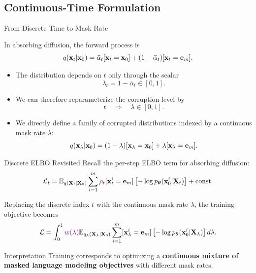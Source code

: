 \documentclass{beamer}
\renewcommand{\eqpause}{}
\begin{document}
\subsection{Continuous-Time Formulation}
\begin{frame}{From Discrete Time to Mask Rate}

    In absorbing diffusion, the forward process is
    \[
        q(\mathbf{x}_t | \mathbf{x}_0) =
        \bar\alpha_t[\mathbf{x}_t=\mathbf{x}_0]
        +
        (1-\bar\alpha_t)[\mathbf{x}_t=\mathbf{e}_m].
    \]
	\vspace{-0.5cm}
    \eqpause
	\begin{itemize}
		\item The distribution depends on $t$ only through the scalar
		\[
			\lambda_t = 1-\bar\alpha_t \in [0,1].
		\]
		\vspace{-0.5cm}
    	\eqpause
		\item We can therefore reparameterize the corruption level by
		\[
			t \quad \Rightarrow \quad \lambda \in [0,1].
		\]
		\vspace{-0.5cm}
		\eqpause
		\item We directly define a family of corrupted distributions indexed by
		a continuous mask rate $\lambda$:
		\[
			q(\mathbf{x}_\lambda | \mathbf{x}_0) =
			(1-\lambda)[\mathbf{x}_{\lambda}=\mathbf{x}_0]
			+ \lambda[\mathbf{x}_{\lambda}=\mathbf{e}_m].
		\]
	\end{itemize}
\end{frame}
\begin{frame}{Discrete ELBO Revisited}
    Recall the per-step ELBO term for absorbing diffusion:
    \[
        \mathcal{L}_t
        =
        \mathbb{E}_{q(\mathbf{X}_t | \mathbf{X}_0)}
        \sum_{i=1}^m
        {\color{violet}\rho_t}[\mathbf{x}_t^i=\mathbf e_m]
        \left[-\log p_{\boldsymbol{\theta}}(\mathbf{x}_0^i | \mathbf{X}_t)\right]
        + \text{const}.
    \]
    \eqpause
    Replacing the discrete index $t$ with the continuous mask rate $\lambda$,
    the training objective becomes
    \[
        \mathcal L
        =
        \int_0^1
       {\color{violet} w(\lambda)}
        \mathbb{E}_{q_\lambda(\mathbf{X}_\lambda | \mathbf{X}_0)}
        \sum_{i=1}^m
        [\mathbf{x}_\lambda^i=\mathbf e_m]
        \left[-\log p_{\boldsymbol{\theta}}(\mathbf{x}_0^i | \mathbf{X}_\lambda)\right] 
		d\lambda.
    \]
    \eqpause
	\begin{block}{Interpretation}
        Training corresponds to optimizing a \textbf{continuous mixture of
        masked language modeling objectives} with different mask rates.
    \end{block}
\end{frame}
\end{document}
